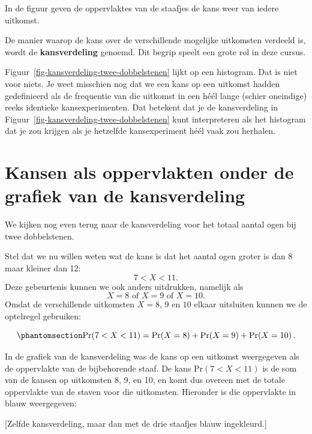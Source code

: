 \documentclass[
  a4paper,
]{scrbook}
\theoremstyle{definition}
\theoremstyle{definition}
\theoremstyle{remark}
\begin{document}
In de figuur geven de oppervlaktes van de staafjes de kans weer van
iedere uitkomst.

De manier waarop de kans over de verschillende mogelijke uitkomsten
verdeeld is, wordt de \textbf{kansverdeling} genoemd. Dit begrip speelt
een grote rol in deze cursus.

\label{tip-kans-en-histo}
Figuur~\ref{fig-kansverdeling-twee-dobbelstenen} lijkt op een histogram.
Dat is niet voor niets. Je weet misschien nog dat we een kans op een
uitkomst hadden gedefinieerd als de frequentie van die uitkomst in een
héél lange (schier oneindige) reeks identieke kansexperimenten. Dat
betekent dat je de kansverdeling in
Figuur~\ref{fig-kansverdeling-twee-dobbelstenen} kunt interpreteren als
het histogram dat je zou krijgen als je hetzelfde kansexperiment héél
vaak zou herhalen.

\section{Kansen als oppervlakten onder de grafiek van de
kansverdeling}\label{kansen-als-oppervlakten-onder-de-grafiek-van-de-kansverdeling}

We kijken nog even terug naar de kansverdeling voor het totaal aantal
ogen bij twee dobbelstenen.

Stel dat we nu willen weten wat de kans is dat het aantal ogen groter is
dan 8 maar kleiner dan 12: \[7 < X < 11.\] Deze gebeurtenis kunnen we
ook anders uitdrukken, namelijk als
\[  X = 8 \textrm{ of } X = 9  \textrm{ of } X = 10.\] Omdat de
verschillende uitkomsten \(X = 8\), \(9\) en \(10\) elkaar uitsluiten
kunnen we de optelregel gebruiken:

\begin{equation}\phantomsection\label{eq-som8_9_10}{ \textrm{Pr}\!\left(7 < X < 11\right)  = \textrm{Pr}\!\left(X = 8\right) + \textrm{Pr}\!\left(X = 9\right) + \textrm{Pr}\!\left(X = 10\right). }\end{equation}

In de grafiek van de kansverdeling was de kans op een uitkomst
weergegeven als de oppervlakte van de bijbehorende staaf. De kans
\(\textrm{Pr}\!\left(7 < X < 11\right)\) is de som van de kansen op
uitkomsten 8, 9, en 10, en komt dus overeen met de totale oppervlakte
van de staven voor die uitkomsten. Hieronder is die oppervlakte in blauw
weergegeven:

{[}Zelfde kansverdeling, maar dan met de drie staafjes blauw
ingekleurd.{]}
\end{document}

